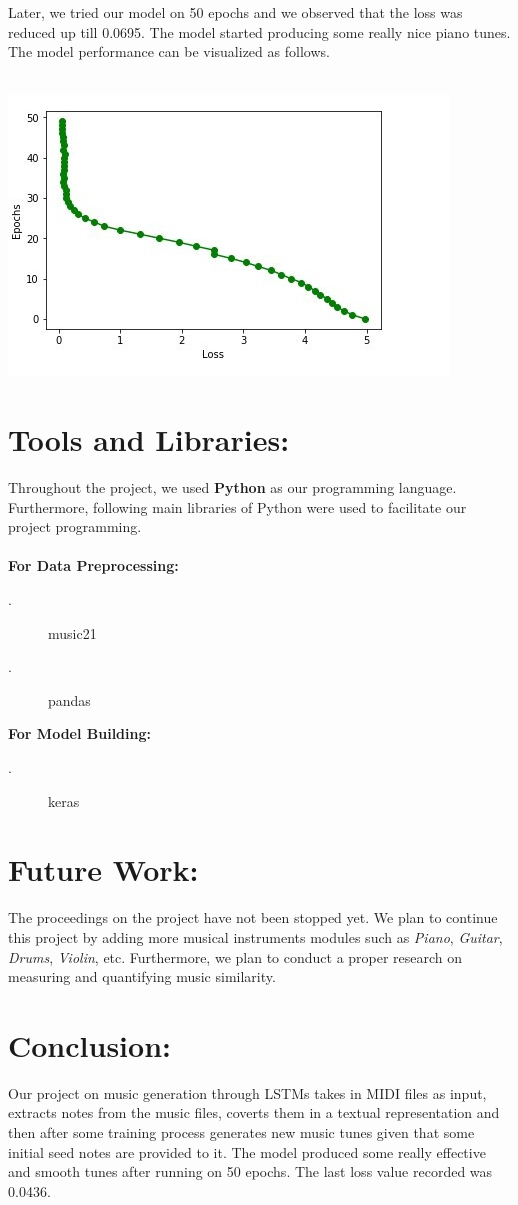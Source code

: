 \documentclass{proc}
\begin{document}
Later, we tried our model on 50 epochs and we observed that the loss was reduced up till 0.0695. The model started producing some really nice piano tunes. The model performance can be visualized as follows. \\ \\
\begin{center}
	\includegraphics[scale=0.70]{./assets/train-2}
\end{center}


\section*{Tools and Libraries:}
Throughout the project, we used \textbf{Python} as our programming language. Furthermore, following main libraries of Python were used to facilitate our 
project programming.\\ \\
\textbf{For Data Preprocessing:}
\begin{description}
	\item[.] music21
	\item[.] pandas
\end{description}
\textbf{For Model Building:}
\begin{description}
	\item[.] keras
\end{description}

\section*{Future Work:}
The proceedings on the project have not been stopped yet. We plan to continue this project by adding more musical instruments modules such as \textit{Piano}, \textit{Guitar}, \textit{Drums}, \textit{Violin}, etc. Furthermore, we plan to conduct a proper research on measuring and quantifying music similarity.

\section*{Conclusion:}
Our project on music generation through LSTMs takes in MIDI files as input, extracts notes from the music files, coverts them in a textual representation and then after some training process generates new music tunes given that some initial seed notes are provided to it. The model produced some really effective and smooth tunes after running on 50 epochs. The last loss value recorded was 0.0436. 
\end{document}
